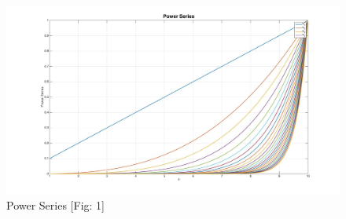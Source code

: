 \begin{figure}[ht!]
\includegraphics[keepaspectratio=true,width=6in]{./figures/appendix/powerSeries.jpg}
\centering
\caption{Power Series \cite{beyene_uwave}[Fig: 1]}
\label{fig:powerSeries}
\end{figure}

